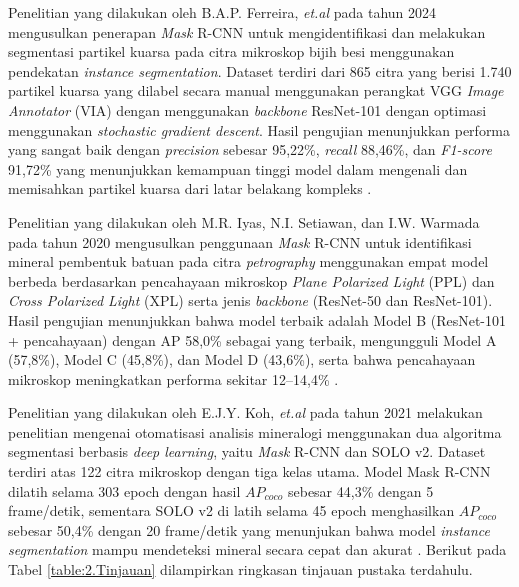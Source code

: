 Penelitian yang dilakukan oleh B.A.P. Ferreira, \textit{et.al} pada tahun 2024 mengusulkan penerapan \textit{Mask} R-CNN untuk mengidentifikasi dan melakukan segmentasi partikel kuarsa pada citra mikroskop bijih besi menggunakan pendekatan \textit{instance segmentation}. Dataset terdiri dari 865 citra yang berisi 1.740 partikel kuarsa yang dilabel secara manual menggunakan perangkat VGG \textit{Image Annotator} (VIA) dengan menggunakan \textit{backbone} ResNet-101 dengan optimasi menggunakan \textit{stochastic gradient descent}. Hasil pengujian menunjukkan performa yang sangat baik dengan \textit{precision} sebesar 95,22\%, \textit{recall} 88,46\%, dan \textit{F1-score} 91,72\% yang menunjukkan kemampuan tinggi model dalam mengenali dan memisahkan partikel kuarsa dari latar belakang kompleks \cite{QuartzMicMaskrcnn}. \par

Penelitian yang dilakukan oleh M.R. Iyas, N.I. Setiawan, dan I.W. Warmada pada tahun 2020 mengusulkan penggunaan \textit{Mask} R-CNN untuk identifikasi mineral pembentuk batuan pada citra \textit{petrography} menggunakan empat model berbeda berdasarkan pencahayaan mikroskop \textit{Plane Polarized Light} (PPL) dan \textit{Cross Polarized Light} (XPL) serta jenis \textit{backbone} (ResNet-50 dan ResNet-101). Hasil pengujian menunjukkan bahwa model terbaik adalah Model B (ResNet-101 + pencahayaan) dengan AP 58,0\% sebagai yang terbaik, mengungguli Model A (57,8\%), Model C (45,8\%), dan Model D (43,6\%), serta bahwa pencahayaan mikroskop meningkatkan performa sekitar 12–14,4\% \cite{maskrcnnKalimantanMic}. \par
 
Penelitian yang dilakukan oleh E.J.Y. Koh, \textit{et.al} pada tahun 2021 melakukan penelitian mengenai otomatisasi analisis mineralogi menggunakan dua algoritma segmentasi berbasis \textit{deep learning}, yaitu \textit{Mask} R-CNN dan SOLO v2. Dataset terdiri atas 122 citra mikroskop dengan tiga kelas utama. Model Mask R-CNN dilatih selama 303 epoch dengan hasil $AP_{coco}$ sebesar 44,3\% dengan 5 frame/detik, sementara SOLO v2 di latih selama 45 epoch menghasilkan $AP_{coco}$ sebesar 50,4\% dengan 20 frame/detik yang menunjukan bahwa model \textit{instance segmentation} mampu mendeteksi mineral secara cepat dan akurat \cite{mineralogiMaskRCNNSolo}. Berikut pada Tabel \ref{table:2.Tinjauan} dilampirkan ringkasan tinjauan pustaka terdahulu. \par

